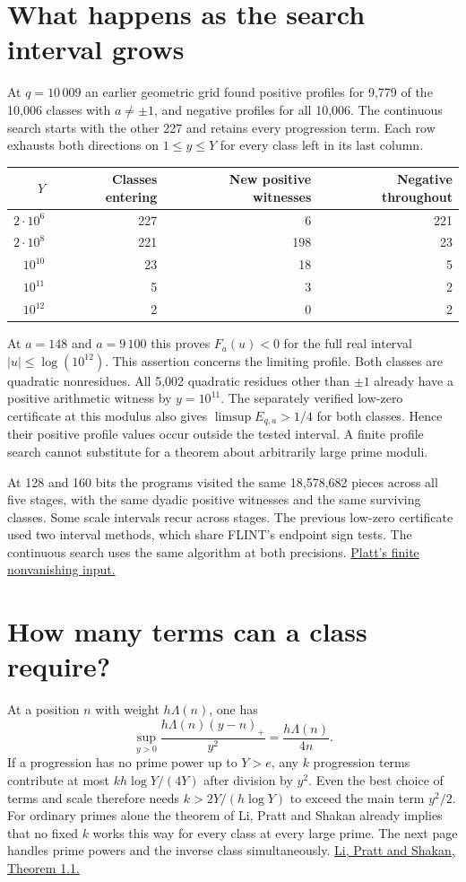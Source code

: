 \documentclass[11pt,a4paper]{article}
\newcommand{\head}[1]{\section*{\color{ink}#1}}
\begin{document}
\newpage
\head{What happens as the search interval grows}
At \(q=10\,009\) an earlier geometric grid found positive profiles for
9,779 of the 10,006 classes with \(a\ne\pm1\), and negative profiles for
all 10,006. The continuous search starts with the other 227 and retains
every progression term. Each row exhausts both directions on \(1\le y\le Y\)
for every class left in its last column.
\begin{center}
\begin{tabular}{r r r r}
\hline
\(Y\)&Classes entering&New positive witnesses&Negative throughout\\
\hline
\(2\cdot10^6\)&227&6&221\\
\(2\cdot10^8\)&221&198&23\\
\(10^{10}\)&23&18&5\\
\(10^{11}\)&5&3&2\\
\(10^{12}\)&2&0&2\\
\hline
\end{tabular}
\end{center}
At \(a=148\) and \(a=9\,100\) this proves \(F_a(u)<0\) for the full real
interval \(|u|\le\log(10^{12})\). This assertion concerns the limiting
profile. Both classes are quadratic nonresidues. All 5,002 quadratic residues
other than \(\pm1\) already have a positive arithmetic witness by \(y=10^{11}\).
The separately verified low-zero certificate at this modulus also gives
\(\limsup E_{q,a}>1/4\) for both classes. Hence their positive profile values occur
outside the tested interval. A finite profile search cannot substitute for
a theorem about arbitrarily large prime moduli.

At 128 and 160 bits the programs visited the same 18,578,682 pieces across all
five stages, with the same dyadic positive witnesses and the same surviving
classes. Some scale intervals recur across stages. The previous low-zero
certificate used two interval methods, which share FLINT's endpoint sign tests. The continuous search
uses the same algorithm at both precisions. \href{https://arxiv.org/pdf/1305.3087#page=14}{Platt's finite nonvanishing input.}

\head{How many terms can a class require?}
At a position \(n\) with weight \(h\Lambda(n)\), one has
\[
 \sup_{y>0}\frac{h\Lambda(n)(y-n)_+}{y^2}
 =\frac{h\Lambda(n)}{4n}.
\]
If a progression has no prime power up to \(Y>e\), any \(k\) progression
terms contribute at most \(kh\log Y/(4Y)\) after division by \(y^2\).
Even the best choice of terms and scale therefore needs
\(k>2Y/(h\log Y)\) to exceed the main term \(y^2/2\).
For ordinary primes alone the theorem of Li, Pratt and Shakan already
implies that no fixed \(k\) works this way for every class at every large
prime. The next page handles prime powers and the inverse class simultaneously.
\href{https://arxiv.org/pdf/1607.02543#page=2}{Li, Pratt and Shakan, Theorem 1.1.}
\end{document}
